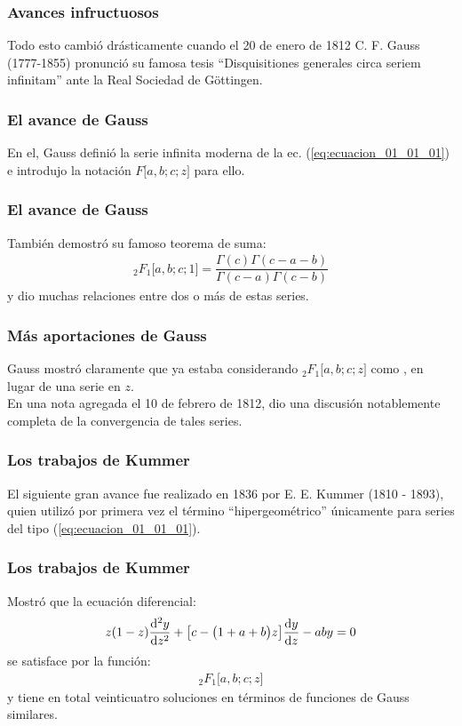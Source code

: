\documentclass[12pt]{beamer}
\begin{document}
\begin{frame}
\frametitle{Avances infructuosos}
Todo esto cambió drásticamente cuando el 20 de enero de 1812 C. F. Gauss (1777-1855) pronunció su famosa tesis \enquote{Disquisitiones generales circa seriem infinitam} ante la Real Sociedad de Göttingen.
\end{frame}
\begin{frame}
\frametitle{El avance de Gauss}
En el, Gauss definió la serie infinita moderna de la ec. (\ref{eq:ecuacion_01_01_01}) e introdujo la notación $F \big[a, b; c; z \big]$ para ello.
\end{frame}
\begin{frame}
\frametitle{El avance de Gauss}
También demostró su famoso teorema de suma:
\pause
\begin{align}
{}_{2} F_{1} \big[ a, b; c; 1 \big] = \dfrac{\Gamma (c) \Gamma (c - a - b)}{\Gamma(c - a) \Gamma (c - b)}
\label{eq:ecuacion_01_01_05}
\end{align}
y dio muchas relaciones entre dos o más de estas series.
\end{frame}
\begin{frame}
\frametitle{Más aportaciones de Gauss}
Gauss mostró claramente que ya estaba considerando ${}_{2} F_{1} \big[ a, b; c; z \big]$ como , en lugar de una serie en $z$.
\\
\bigskip
\pause
En una nota agregada el 10 de febrero de 1812, dio una discusión notablemente completa de la convergencia de tales series.
\end{frame}
\begin{frame}
\frametitle{Los trabajos de Kummer}
El siguiente gran avance fue realizado en 1836 por E. E. Kummer (1810 - 1893), quien utilizó por primera vez el término \enquote{hipergeométrico} únicamente para series del tipo (\ref{eq:ecuacion_01_01_01}).
\end{frame}
\begin{frame}
\frametitle{Los trabajos de Kummer}
Mostró que la ecuación diferencial:
\pause
\begin{align}
z (1 - z) \dv[2]{y}{z} + \big[ c - \big( 1 + a + b \big) z \big] \dv{y}{z} - a b y = 0
\label{eq:ecuacion_01_01_06}
\end{align}
se satisface por la función:
\pause
\begin{align*}
{}_{2} F_{1} \big[ a, b; c; z \big]
\end{align*}
y tiene en total veinticuatro soluciones en términos de funciones de Gauss similares.
\end{frame}
\end{document}
